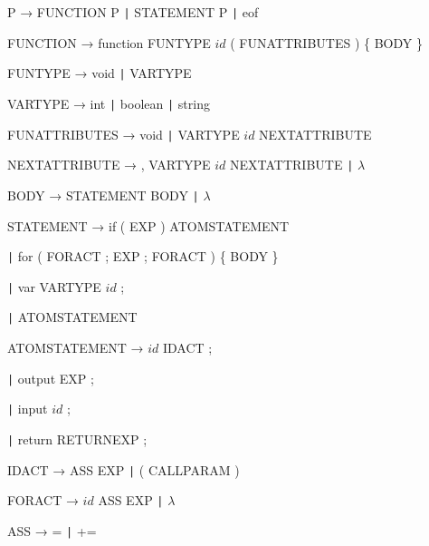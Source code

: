 \documentclass{article}
\begin{document}
\begin{tcolorbox}[title=Gramática de Contexto Libre]
    \hspace{0.5cm} P → FUNCTION P \texttt{|} STATEMENT P \texttt{|} eof
    
    \hspace{0.5cm} FUNCTION → function FUNTYPE $id$ ( FUNATTRIBUTES ) \{ BODY \}
    
    \hspace{0.5cm} FUNTYPE → void \texttt{|} VARTYPE
    
    \hspace{0.5cm} VARTYPE → int \texttt{|} boolean \texttt{|} string
    
    \hspace{0.5cm} FUNATTRIBUTES → void \texttt{|} VARTYPE $id$ NEXTATTRIBUTE
    
    \hspace{0.5cm} NEXTATTRIBUTE → , VARTYPE $id$ NEXTATTRIBUTE \texttt{|} \( \lambda \)
    
    \hspace{0.5cm} BODY → STATEMENT BODY \texttt{|} \( \lambda \)
    
    \hspace{0.5cm} STATEMENT → if ( EXP ) ATOMSTATEMENT 
    
    \hspace{0.5cm} \texttt{|} for ( FORACT ; EXP ; FORACT ) \{ BODY \} 
    
    \hspace{0.5cm} \texttt{|} var VARTYPE $id$ ;
    
    \hspace{0.5cm} \texttt{|} ATOMSTATEMENT
    
    \hspace{0.5cm} ATOMSTATEMENT → $id$ IDACT ; 
    
    \hspace{0.5cm} \texttt{|} output EXP ;
    
    \hspace{0.5cm} \texttt{|} input $id$ ;
    
    \hspace{0.5cm} \texttt{|} return RETURNEXP ;
    
    \hspace{0.5cm} IDACT → ASS EXP \texttt{|} ( CALLPARAM )
    
    \hspace{0.5cm} FORACT → $id$ ASS EXP \texttt{|} \( \lambda \)
    
    \hspace{0.5cm} ASS → = \texttt{|} +=
    

\end{tcolorbox}
\end{document}
